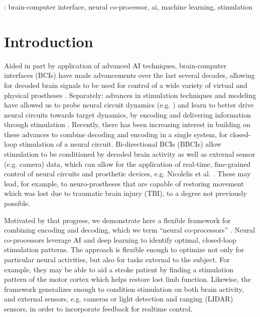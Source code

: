 \documentclass[12pt]{iopart}
\begin{document}
\vspace{2pc}
: brain-computer interface, neural co-processor, ai, machine learning, stimulation
%
%
\maketitle
% 
%



\section{Introduction}
Aided in part by application of advanced AI techniques, brain-computer interfaces (BCIs) have made
advancements over the last several decades, allowing for decoded brain signals to be used for
control of a wide variety of virtual and physical prostheses \cite{rao.bcibook, wolpaw.bcibook,
moritz.neuro, lebedev.bmi}. Separately: advances in stimulation techniques and modeling have allowed
us to probe neural circuit dynamics (e.g. \cite{walker.inception}) and learn to better drive neural
circuits towards target dynamics, by encoding and delivering information through
stimulation \cite{niparko.cochlear, weiland.retinal, tomlinson.propr, tabot.tact, tyler.tact,
dadarlat.tact, sharlene.tact, cronin.tact}.
Recently, there has been increasing interest in building on these advances to combine decoding
and encoding in a single system, for closed-loop stimulation of a neural circuit. Bi-directional
BCIs (BBCIs) allow stimulation to be conditioned by decoded brain activity as well as external
sensor (e.g. camera) data, which can allow for the application of real-time, fine-grained control of
neural circuits and prosthetic devices, e.g. Nicolelis et al. \cite{nicolelis.bmbi}. These may lead,
for example, to neuro-prostheses that are capable of restoring movement which was lost due to
traumatic brain injury (TBI), to a degree not previously possible.

Motivated by that progress, we demonstrate here a flexible framework for combining encoding
and decoding, which we term ``neural co-processors'' \cite{rao.coproc}. Neural co-processors leverage
AI and deep learning to identify optimal, closed-loop stimulation patterns. The approach is flexible
enough to optimize not only for particular neural activities, but also for tasks external to the
subject. For example, they may be able to aid a stroke patient by finding a stimulation pattern of
the motor cortex which helps restore lost limb function. Likewise, the framework generalizes enough
to condition stimulation on both brain activity, and external sensors, e.g. cameras or light detection
and ranging (LIDAR) sensors, in order to incorporate feedback for realtime control.
\end{document}
